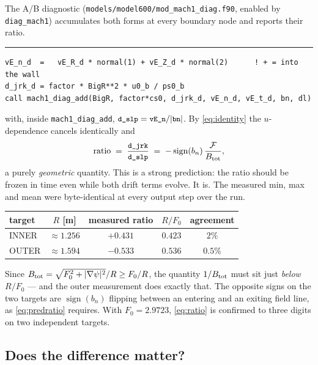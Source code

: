 \documentclass[11pt,a4paper]{article}
\newenvironment{codeline}[1]
  {\par\medskip\noindent\textcolor{coderule}{\rule{\linewidth}{0.4pt}}\par
   \nopagebreak\noindent{\ttfamily\footnotesize\textcolor{keyc}{#1}}\par\nopagebreak\smallskip}
  {\par\medskip}
\newcommand{\code}[1]{\texttt{\small #1}}
\begin{document}
The A/B diagnostic (\code{models/model600/mod\_mach1\_diag.f90}, enabled by
\code{diag\_mach1}) accumulates both forms at every boundary node and reports their ratio.

\begin{codeline}{mod\_boundary\_conditions.f90:632--650 \quad\normalfont\itshape(diagnostic only; imposes nothing)}
\begin{lstlisting}
vE_n_d  =   vE_R_d * normal(1) + vE_Z_d * normal(2)      ! + = into the wall
d_jrk_d = factor * BigR**2 * u0_b / ps0_b
call mach1_diag_add(BigR, factor*cs0, d_jrk_d, vE_n_d, vE_t_d, bn, dl)
\end{lstlisting}
\end{codeline}

\noindent with, inside \code{mach1\_diag\_add}, $\code{d\_slp} = \code{vE\_n}/|\code{bn}|$.
By \eqref{eq:identity} the $u$-dependence cancels identically and
\begin{equation}
  \text{ratio} \;=\; \frac{\code{d\_jrk}}{\code{d\_slp}}
  \;=\; -\operatorname{sign}(b_n)\,\frac{\mathcal{F}}{B_{\rm tot}} ,
  \label{eq:predratio}
\end{equation}
a purely \emph{geometric} quantity.  This is a strong prediction: the ratio should be frozen
in time even while both drift terms evolve.  It is.  The measured min, max and mean were
byte-identical at every output step over the run.

\begin{center}
\begin{tabular}{lcccc}
\toprule
target & $R$ [m] & measured ratio & $R/F_0$ & agreement \\
\midrule
INNER  & $\approx 1.256$ & $+0.431$ & $0.423$ & $2\%$ \\
OUTER  & $\approx 1.594$ & $-0.533$ & $0.536$ & $0.5\%$ \\
\bottomrule
\end{tabular}
\end{center}

\noindent Since $B_{\rm tot} = \sqrt{F_0^2+|\nabla\psi|^2}/R \ge F_0/R$, the quantity
$1/B_{\rm tot}$ must sit just \emph{below} $R/F_0$ --- and the outer measurement does exactly
that.  The opposite signs on the two targets are $\operatorname{sign}(b_n)$ flipping between an
entering and an exiting field line, as \eqref{eq:predratio} requires.  With $F_0 = 2.9723$,
\eqref{eq:ratio} is confirmed to three digits on two independent targets.

\subsection*{Does the difference matter?}
\end{document}
